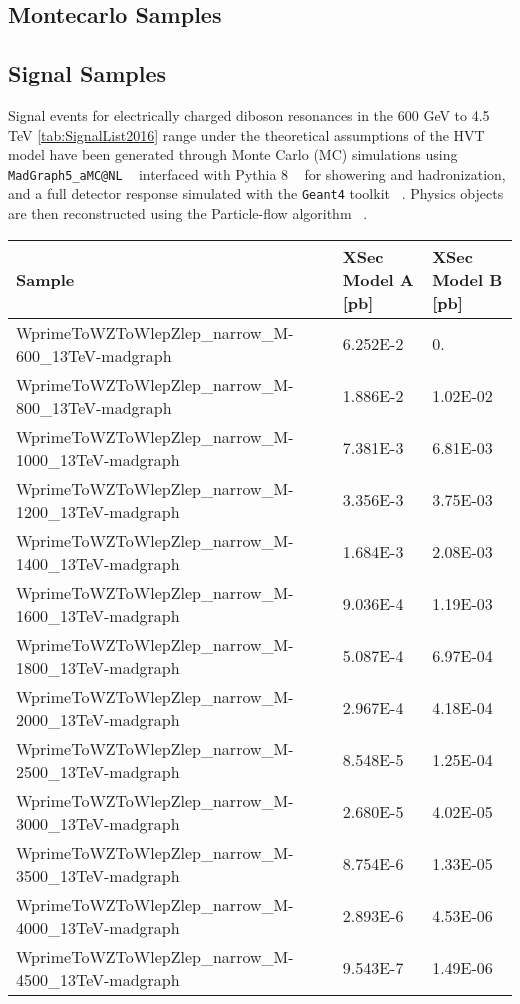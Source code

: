 \subsection{Montecarlo Samples}


\subsection {Signal Samples}

Signal events for electrically charged diboson resonances in the 600 GeV
to 4.5 TeV \ref{tab:SignalList2016} range under the theoretical assumptions
of the HVT model have been generated through Monte Carlo (MC) simulations
using \verb|MadGraph5_aMC@NL| ~\cite{madgraph} interfaced with Pythia 8
~\cite{pythia} for showering and hadronization, and a
full detector response simulated with the \verb|Geant4| toolkit ~\cite{geant4}.
Physics objects are then reconstructed using the
Particle-flow algorithm ~\cite{particleflow}.




\begin{sidewaystable}[htb]
\begin{center}
\caption{List of background samples for 2016}
\footnotesize
\begin{tabular}{|l|l|l|}
\hline
Sample & XSec Model A [pb] & XSec Model B [pb]\\ \hline
\hline
WprimeToWZToWlepZlep\_narrow\_M-600\_13TeV-madgraph  & 6.252E-2 & 0. \\
WprimeToWZToWlepZlep\_narrow\_M-800\_13TeV-madgraph  & 1.886E-2 & 1.02E-02\\
WprimeToWZToWlepZlep\_narrow\_M-1000\_13TeV-madgraph & 7.381E-3 & 6.81E-03\\
WprimeToWZToWlepZlep\_narrow\_M-1200\_13TeV-madgraph & 3.356E-3 & 3.75E-03\\
WprimeToWZToWlepZlep\_narrow\_M-1400\_13TeV-madgraph & 1.684E-3 & 2.08E-03\\
WprimeToWZToWlepZlep\_narrow\_M-1600\_13TeV-madgraph & 9.036E-4 & 1.19E-03\\
WprimeToWZToWlepZlep\_narrow\_M-1800\_13TeV-madgraph & 5.087E-4 & 6.97E-04\\
WprimeToWZToWlepZlep\_narrow\_M-2000\_13TeV-madgraph & 2.967E-4 & 4.18E-04\\
WprimeToWZToWlepZlep\_narrow\_M-2500\_13TeV-madgraph & 8.548E-5 & 1.25E-04\\
WprimeToWZToWlepZlep\_narrow\_M-3000\_13TeV-madgraph & 2.680E-5 & 4.02E-05\\
WprimeToWZToWlepZlep\_narrow\_M-3500\_13TeV-madgraph & 8.754E-6 & 1.33E-05\\
WprimeToWZToWlepZlep\_narrow\_M-4000\_13TeV-madgraph & 2.893E-6 & 4.53E-06\\
WprimeToWZToWlepZlep\_narrow\_M-4500\_13TeV-madgraph & 9.543E-7 & 1.49E-06\\
\hline
\end{tabular}
\label{tab:SignalList2016}
\end{center}
\end{sidewaystable}



